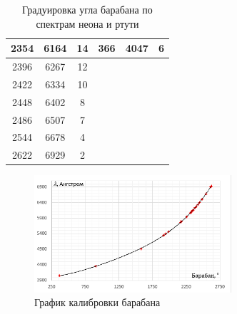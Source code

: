 \documentclass[a4paper]{article}
\begin{document}
\begin{table}[!ht]
\begin{tabular}{|ccc|ccc|}
    \multicolumn{1}{|c|}{2354}                   & \multicolumn{1}{c|}{6164}         & 14     & \multicolumn{1}{c|}{366}                    & \multicolumn{1}{c|}{4047}         & 6      \\ \hline
    \multicolumn{1}{|c|}{2396}                   & \multicolumn{1}{c|}{6267}         & 12     & \multicolumn{1}{c|}{}                       & \multicolumn{1}{c|}{}             &        \\ \hline
    \multicolumn{1}{|c|}{2422}                   & \multicolumn{1}{c|}{6334}         & 10     & \multicolumn{1}{c|}{}                       & \multicolumn{1}{c|}{}             &        \\ \hline
    \multicolumn{1}{|c|}{2448}                   & \multicolumn{1}{c|}{6402}         & 8      & \multicolumn{1}{c|}{}                       & \multicolumn{1}{c|}{}             &        \\ \hline
    \multicolumn{1}{|c|}{2486}                   & \multicolumn{1}{c|}{6507}         & 7      & \multicolumn{1}{c|}{}                       & \multicolumn{1}{c|}{}             &        \\ \hline
    \multicolumn{1}{|c|}{2544}                   & \multicolumn{1}{c|}{6678}         & 4      & \multicolumn{1}{c|}{}                       & \multicolumn{1}{c|}{}             &        \\ \hline
    \multicolumn{1}{|c|}{2622}                   & \multicolumn{1}{c|}{6929}         & 2      & \multicolumn{1}{c|}{}                       & \multicolumn{1}{c|}{}             &        \\ \hline
    \end{tabular}
    \caption{Градуировка угла барабана по спектрам неона и ртути}
\end{table}

\newpage

\begin{figure}[!ht]
    \begin{center}
        \includegraphics[width = 0.65\textwidth]{image/graph1.png}
        \caption{График калибровки барабана}
    \end{center}
\end{figure}
\end{document}
